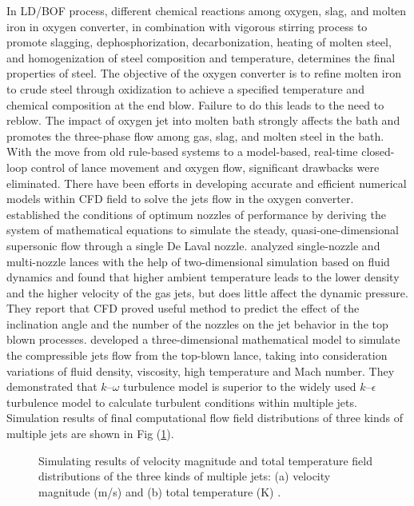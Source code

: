 In LD/BOF process, different chemical reactions among oxygen, slag, and molten iron in oxygen converter, in combination with vigorous stirring process to promote slagging, dephosphorization, decarbonization, heating of molten steel, and homogenization of steel composition and temperature, determines the final properties of steel. The objective of the oxygen converter is to refine molten iron to crude steel through oxidization to achieve a specified temperature and chemical composition at the end blow. Failure to do this leads to the need to reblow. The impact of oxygen jet into molten bath strongly affects the bath and promotes the three-phase flow among gas, slag, and molten steel in the bath. With the move from old rule-based systems to a model-based, real-time closed-loop control of lance movement and oxygen flow, significant drawbacks were eliminated. There have been efforts in developing accurate and efficient numerical models within CFD field to solve the jets flow in the oxygen converter. \citet{Peng1996} established the conditions of optimum nozzles of performance by deriving the system of mathematical equations to simulate the steady, quasi-one-dimensional supersonic flow through a single De Laval nozzle. \citet{Tago2003} analyzed single-nozzle and multi-nozzle lances with the help of two-dimensional simulation based on fluid dynamics and found that higher ambient temperature leads to the lower density and the higher velocity of the gas jets, but does little affect the dynamic pressure. They report that CFD proved useful method to predict the effect of the inclination angle and the number of the nozzles on the jet behavior in the top blown processes. \citet{WangW2010} developed a three-dimensional mathematical model to simulate the compressible jets flow from the top-blown lance, taking into consideration variations of fluid density, viscosity, high temperature and Mach number. They demonstrated that $k–\omega$ turbulence model is superior to the widely used $k–\epsilon$ turbulence model to calculate turbulent conditions within multiple jets. Simulation results of final computational flow field distributions of three kinds of multiple jets are shown in Fig (\ref{o:m1}).

\begin{figure}[h!tbp]
	\centering
	\hfill
	\caption{Simulating results of velocity magnitude and total temperature field distributions of the three kinds of multiple jets: (a) velocity magnitude (m/s) and (b) total temperature (K) \citep{WangW2010}.}
	\label{o:m1}
\end{figure}

